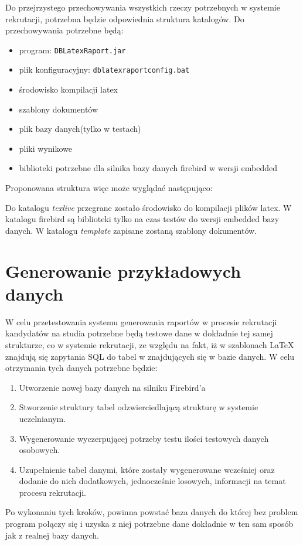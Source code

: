 Do przejrzystego przechowywania wszystkich rzeczy potrzebnych w systemie rekrutacji, potrzebna będzie odpowiednia struktura katalogów. Do przechowywania potrzebne będą: \\
\begin{itemize}
\item program: \texttt{DBLatexRaport.jar}
\item plik konfiguracyjny: \texttt{dblatexraportconfig.bat}
\item środowisko kompilacji latex
\item szablony dokumentów 
\item plik bazy danych(tylko w testach)
\item pliki wynikowe
\item biblioteki potrzebne dla silnika bazy danych firebird w wersji embedded \\
\end{itemize}

Proponowana struktura więc może wyglądać następująco:

\vspace{5mm}
Do katalogu \emph{texlive} przegrane zostało środowisko do kompilacji plików latex. W katalogu firebird są biblioteki tylko na czas testów do wersji embedded bazy danych. W katalogu \emph{template} zapisane zostaną szablony dokumentów.


\section{Generowanie przykładowych danych}

W celu przetestowania systemu generowania raportów w procesie rekrutacji kandydatów na studia potrzebne będą testowe dane w dokładnie tej samej strukturze, co w systemie rekrutacji, ze względu na fakt, iż w szablonach LaTeX znajdują się zapytania SQL do tabel w znajdujących się w bazie danych. 
W celu otrzymania tych danych potrzebne będzie:
\begin{enumerate}

\item	Utworzenie nowej bazy danych na silniku Firebird’a 
\item	Stworzenie struktury tabel odzwierciedlającą strukturę w systemie uczelnianym.
\item	Wygenerowanie wyczerpującej potrzeby testu ilości testowych danych osobowych.
\item	Uzupełnienie tabel danymi, które zostały wygenerowane wcześniej oraz dodanie do nich dodatkowych, jednocześnie losowych, informacji na temat procesu rekrutacji.
\vspace{5mm}
\end{enumerate}
Po wykonaniu tych kroków, powinna powstać baza danych do której bez problem program połączy się i uzyska z niej potrzebne dane dokładnie w ten sam sposób jak z realnej bazy danych.


